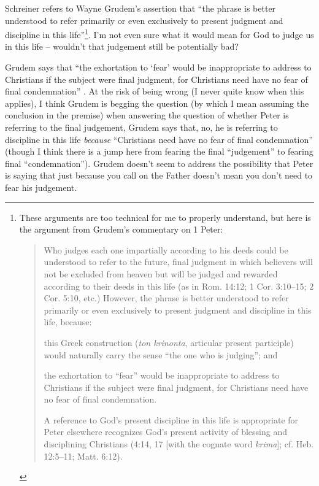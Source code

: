 Schreiner refers to Wayne Grudem's assertion that \enquote{the phrase is better
understood to refer primarily or even exclusively to present judgment and
discipline in this life}\footnote{%
    These arguments are too technical for me to properly understand, but here is
    the argument from Grudem's commentary on 1 Peter:

    \begin{quote}
        Who judges each one impartially according to his deeds could be
        understood to refer to the future, final judgment in which believers
        will not be excluded from heaven but will be judged and rewarded
        according to their deeds in this life (as in Rom. 14:12; 1 Cor.
        3:10--15; 2 Cor. 5:10, etc.) However, the phrase is better understood to
        refer primarily or even exclusively to present judgment and discipline
        in this life, because:\begin{inparaenum}[(1)]
        \item this Greek construction (\textit{ton krinonta}, articular present
            participle) would naturally carry the sense \enquote{the one who is
            judging}; and
        \item the exhortation to \enquote{fear} would be inappropriate to
            address to Christians if the subject were final judgment, for
            Christians need have no fear of final condemnation.
        \end{inparaenum}

        A reference to God's present discipline in this life is appropriate for
        Peter elsewhere recognizes God's present activity of blessing and
        disciplining Christians (4:14, 17 [with the cognate word
        \textit{krima}]; cf. Heb. 12:5--11; Matt. 6:12).
        \autocite[86]{grudem:2009}
    \end{quote}
}. I'm not even sure what it would mean for God to judge us in this life --
wouldn't that judgement still be potentially bad?

Grudem says that \enquote{the exhortation to \enquote{fear} would be
inappropriate to address to Christians if the subject were final judgment, for
Christians need have no fear of final condemnation}
\autocite[86]{grudem:2009}. At the risk of being wrong (I never quite know when
this applies), I think Grudem is begging the question (by which I mean assuming
the conclusion in the premise) when answering the question of whether Peter is
referring to the final judgement, Grudem says that, no, he is referring to
discipline in this life \emph{because} \enquote{Christians need have no fear of
final condemnation} (though I think there is a jump here from fearing the final
\enquote{judgement} to fearing final \enquote{condemnation}). Grudem doesn't
seem to address the possibility that Peter is saying that just because you call
on the Father doesn't mean you don't need to fear his judgement.

